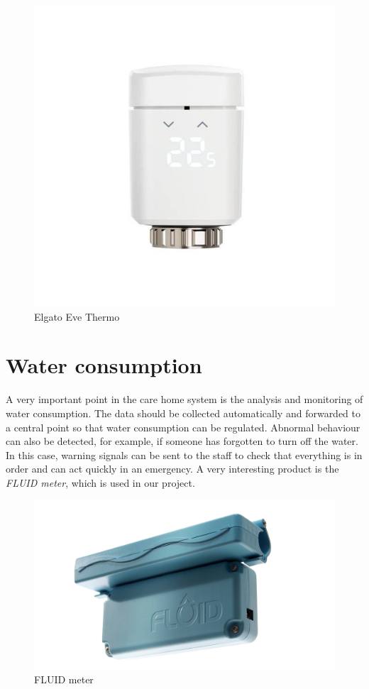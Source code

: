 \begin{figure}[h]
	\centering
	\includegraphics[width=.5\textwidth, trim=0 3cm 0 3cm, clip]{images/CostAnalysis/elgato-eve-thermo} 
	\caption[Elgato Eve Thermo]{Elgato Eve Thermo\footnotemark}
	\label{fig:elgatoEve}
\end{figure}
\newpage
\section{Water consumption}
A very important point in the care home system is the analysis and monitoring of water consumption. The data should be collected automatically and forwarded to a central point so that water consumption can be regulated. Abnormal behaviour can also be detected, for example, if someone has forgotten to turn off the water. In this case, warning signals can be sent to the staff to check that everything is in order and can act quickly in an emergency. A very interesting product is the \textit{FLUID meter}, which is used in our project.

\begin{figure}[h]
	\centering
	\includegraphics[width=.6\textwidth]{images/CostAnalysis/fluidMeter} 
	\caption[FLUID meter]{FLUID meter\footnotemark}
	\label{fig:fluidMeter}
\end{figure}
\newpage
